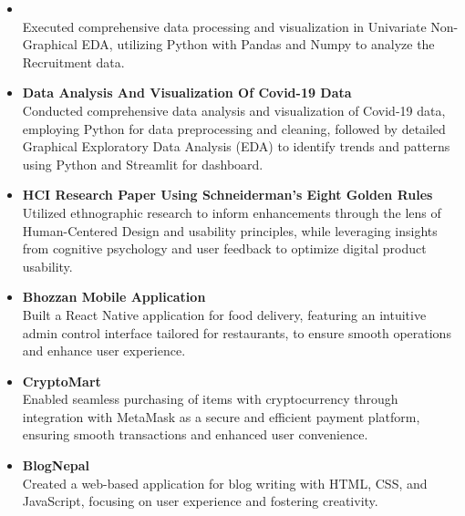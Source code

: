 \documentclass[11pt]{article}
\begin{document}
\begin{itemize}[noitemsep]

    \item{} \\
              Executed comprehensive data processing and visualization in Univariate Non-Graphical EDA, utilizing Python with Pandas and Numpy  to analyze the Recruitment data.
          \\

    \item {\Large\textbf{Data Analysis And Visualization Of Covid-19 Data}} \\
              Conducted comprehensive data analysis and visualization of Covid-19 data, employing Python for data preprocessing and cleaning, followed by detailed Graphical Exploratory Data Analysis (EDA) to identify trends and patterns using Python and Streamlit for dashboard.
            \\
    \item {\Large\textbf{HCI Research Paper Using Schneiderman’s Eight Golden Rules}} \\
          Utilized ethnographic research to inform enhancements through the lens of Human-Centered Design and usability principles, while leveraging insights from cognitive psychology and user feedback to optimize digital product usability.
          \\
            

            
    \item {\Large\textbf{Bhozzan Mobile Application}} \\
          Built a React Native application for food delivery, featuring an intuitive admin control interface tailored for restaurants, to ensure smooth operations and enhance user experience.
            \\
          
    \item {\Large\textbf{CryptoMart}} \\
             Enabled seamless purchasing of items with cryptocurrency through integration with MetaMask as a secure and efficient payment platform, ensuring smooth transactions and enhanced user convenience.
            \\
          
    \item {\Large\textbf{BlogNepal}} \\
          Created a web-based application for blog writing with HTML, CSS, and JavaScript, focusing on user experience and fostering creativity.
        \\
          

\end{itemize}
\end{document}
